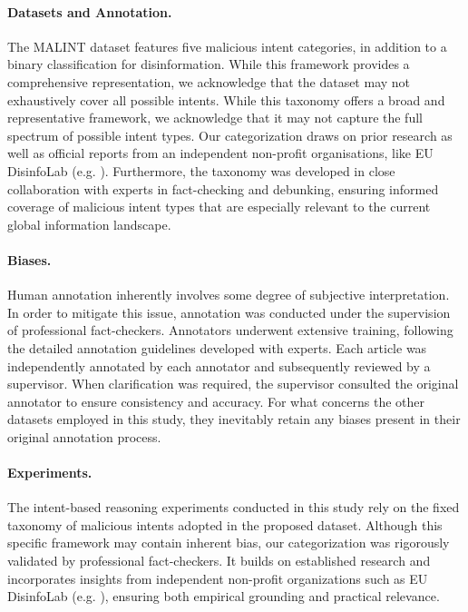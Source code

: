 \documentclass[11pt]{article}
\begin{document}
\paragraph{Datasets and Annotation.}
The MALINT dataset features five malicious intent categories, in addition to a binary classification for disinformation. While this framework provides a comprehensive representation, we acknowledge that the dataset may not exhaustively cover all possible intents. While this taxonomy offers a broad and representative framework, we acknowledge that it may not capture the full spectrum of possible intent types. Our categorization draws on prior research \cite{modzelewski2024mipd} as well as official reports from an independent non-profit organisations, like EU DisinfoLab (e.g. \citet{sessa2023connecting}). Furthermore, the taxonomy was developed in close collaboration with experts in fact-checking and debunking, ensuring informed coverage of malicious intent types that are especially relevant to the current global information landscape. 

\paragraph{Biases.}
Human annotation inherently involves some degree of subjective interpretation. In order to mitigate this issue, annotation was conducted under the supervision of professional fact-checkers. Annotators underwent extensive training, following the detailed annotation guidelines developed with experts. Each article was independently annotated by each annotator and subsequently reviewed by a supervisor. When clarification was required, the supervisor consulted the original annotator to ensure consistency and accuracy. For what concerns the other datasets employed in this study, they inevitably retain any biases present in their original annotation process.

\paragraph{Experiments.} The intent-based reasoning experiments conducted in this study rely on the fixed taxonomy of malicious intents adopted in the proposed dataset. Although this specific framework may contain inherent bias, our categorization was rigorously validated by professional fact-checkers. It builds on established research \cite{modzelewski2024mipd} and incorporates insights from independent non-profit organizations such as EU DisinfoLab (e.g. \citet{sessa2023connecting}), ensuring both empirical grounding and practical relevance.
\end{document}

